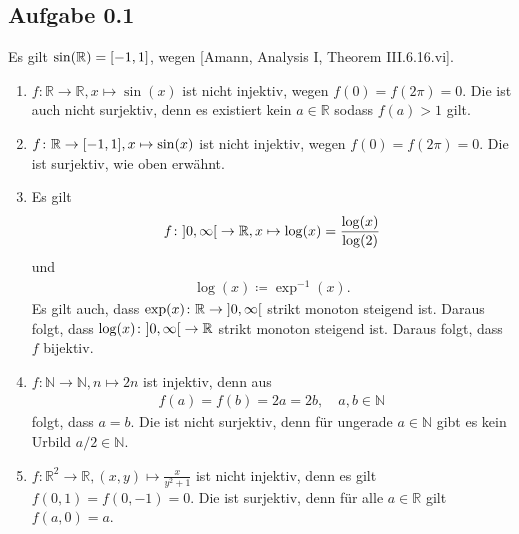 \subsection*{Aufgabe 0.1}
Es gilt \(\sin(\mathbb{R}) = \interval{-1}{1}\), wegen [Amann, Analysis I,
Theorem III.6.16.vi].

\begin{enumerate}
\item \(f\colon \mathbb{R} \to \mathbb{R}, x \mapsto \sin(x)\) ist nicht injektiv, wegen
  \(f(0) = f(2\pi) = 0\).
  Die ist auch nicht surjektiv, denn es existiert kein
  \(a \in \mathbb{R}\) sodass \(f(a) >1\) gilt.
\item \(f\colon \mathbb{R} \to \interval{-1}{1}, x \mapsto \sin(x)\) ist nicht injektiv, wegen
  \(f(0) = f(2\pi) = 0\).
  Die ist surjektiv, wie oben erwähnt.
\item Es gilt
  \begin{align*}
    f\colon \ointerval{0}{\infty} \to \mathbb{R}, x \mapsto
  \log(x) = \frac{\log(x)}{\log(2)}
  \end{align*}
  und
  \begin{align*}
    \log(x)\coloneq\exp^{-1}(x).
  \end{align*}
  Es gilt auch, dass
  \(\exp(x)\colon \mathbb{R} \to \ointerval{0}{\infty}\) strikt monoton steigend ist.
  Daraus folgt, dass
  \(\log(x)\colon \ointerval{0}{\infty} \to \mathbb{R}\) strikt monoton steigend ist.  Daraus
  folgt, dass \(f\) bijektiv.
\item \(f\colon \mathbb{N} \to \mathbb{N}, n \mapsto 2n\) ist injektiv, denn aus
  \begin{align*}
    f(a) = f(b) = 2a = 2b, \quad a, b \in \mathbb{N}
  \end{align*}
  folgt, dass \(a = b\). Die ist nicht surjektiv, denn für ungerade
  \(a \in \mathbb{N}\) gibt es kein Urbild \(a/2 \in \mathbb{N}\).
\item \(f\colon \mathbb{R}^{2} \to \mathbb{R}, (x, y) \mapsto \frac{x}{y^{2}+1}\) ist nicht
  injektiv, denn es gilt \(f(0, 1) = f(0, -1) = 0\). Die ist
  surjektiv, denn für alle \(a \in \mathbb{R}\) gilt \(f(a, 0) = a\).
\end{enumerate}
